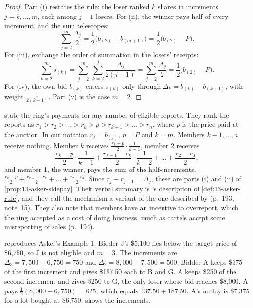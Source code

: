 \begin{proof}
Part (i) restates the rule: the loser ranked $k$ shares in increments $j=k,\dots,m$, each among $j-1$ losers.
For (ii), the winner pays half of every increment, and the sum telescopes:
\[
\sum_{j=2}^{m}\frac{\Delta_j}{2}=\frac{1}{2}\bigl(b_{(2)}-b_{(m+1)}\bigr)=\frac{1}{2}\bigl(b_{(2)}-P\bigr) .
\]
For (iii), exchange the order of summation in the losers' receipts:
\[
\sum_{k=2}^{m}s_{(k)}=\sum_{j=2}^{m}\ \sum_{k=2}^{j}\frac{\Delta_j}{2(j-1)}=\sum_{j=2}^{m}\frac{\Delta_j}{2}
=\frac{1}{2}\bigl(b_{(2)}-P\bigr) .
\]
For (iv), the own bid $b_{(k)}$ enters $s_{(k)}$ only through $\Delta_k=b_{(k)}-b_{(k+1)}$, with weight
$\frac{1}{2(k-1)}$. Part (v) is the case $m=2$.
\end{proof}

\begin{remark}\label{rem:13-mm-table91}
\citet[pp.~192--194, Table~9.1]{MarshallMarx2012} state the ring's payments for any number of eligible reports. They
rank the reports as $r_1 > r_2 > \dots > r_k > p > r_{k+1} > \dots > r_n$, where $p$ is the price paid at the
auction. In our notation $r_j = b_{(j)}$, $p = P$ and $k = m$. Members $k+1, \dots, n$ receive nothing. Member $k$
receives $\frac{r_k - p}{2}\cdot\frac{1}{k-1}$, member 2 receives
\begin{equation*}
  \frac{r_k - p}{2}\cdot\frac{1}{k-1} + \frac{r_{k-1} - r_k}{2}\cdot\frac{1}{k-2} + \dots + \frac{r_2 - r_3}{2} ,
\end{equation*}
and member 1, the winner, pays the sum of the half-increments, $\frac{r_k - p}{2} + \frac{r_{k-1} - r_k}{2} + \dots
+ \frac{r_2 - r_3}{2}$. Since $r_j - r_{j+1} = \Delta_j$, these are parts (i) and (ii) of \cref{prop:13-asker-sidepay}.
Their verbal summary is \citeauthor{Asker2010}'s description of \cref{def:13-asker-rule}, and they call the mechanism a
variant of the one described by \citet{GrahamMarshallRichard1990} (p.~193, note~15). They also note that members
have an incentive to overreport, which the ring accepted as a cost of doing business, much as cartels accept some
misreporting of sales (p.~194).
\end{remark}

\begin{example}\label{ex:13-asker-ko}
 reproduces Asker's Example 1. Bidder J's \$5,100 lies below the target price of
\$6,750, so J is not eligible and $m=3$. The increments are $\Delta_3=7{,}500-6{,}750=750$ and
$\Delta_2=8{,}000-7{,}500=500$. Bidder A keeps \$375 of the first increment and gives \$187.50 each to B and G.
A keeps \$250 of the second increment and gives \$250 to G, the only loser whose bid reaches \$8,000. A pays
$\frac{1}{2}(8{,}000-6{,}750)=625$, which equals $437.50+187.50$. A's outlay is \$7,375 for a lot bought at
\$6,750.  shows the increments.
\end{example}

